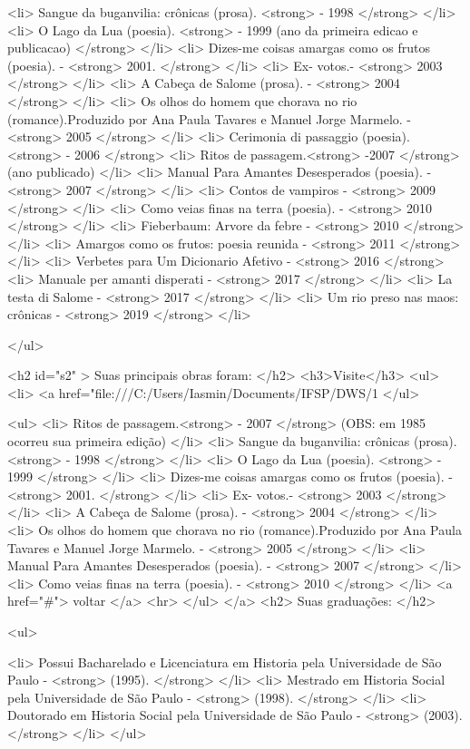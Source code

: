 <li> Sangue da buganvilia: crônicas (prosa). <strong> - 1998 </strong> </li> 
<li> O Lago da Lua (poesia). <strong> - 1999 (ano da primeira edicao e publicacao) </strong> </li>
<li> Dizes-me coisas amargas como os frutos (poesia). - <strong> 2001. </strong> </li>
<li> Ex- votos.- <strong> 2003 </strong> </li>
<li> A Cabeça de Salome (prosa). - <strong> 2004 </strong> </li>
<li> Os olhos do homem que chorava no rio (romance).Produzido por Ana Paula Tavares e Manuel Jorge Marmelo. - <strong> 2005 </strong> </li>
<li> Cerimonia di passaggio (poesia). <strong> - 2006 </strong>
<li> Ritos de passagem.<strong> -2007 </strong> (ano publicado) </li>
<li> Manual Para Amantes Desesperados (poesia). - <strong> 2007 </strong> </li>
<li> Contos de vampiros - <strong> 2009 </strong> </li>
<li> Como veias finas na terra (poesia). - <strong> 2010 </strong> </li>
<li> Fieberbaum: Arvore da febre - <strong> 2010 </strong> </li>
<li> Amargos como os frutos: poesia reunida - <strong> 2011 </strong> </li>
<li> Verbetes para Um Dicionario Afetivo - <strong> 2016 </strong>
<li> Manuale per amanti disperati - <strong> 2017 </strong> </li>
<li> La testa di Salome - <strong> 2017 </strong> </li>
<li> Um rio preso nas maos: crônicas - <strong> 2019 </strong> </li>

 </ul>
  
    <h2 id="s2" > Suas principais obras foram: </h2>
	 <h3>Visite</h3> 
  <ul>
 <li> <a href="file:///C:/Users/Iasmin/Documents/IFSP/DWS/1%
 </ul>

<ul>
  <li>  Ritos de passagem.<strong> - 2007 </strong> (OBS: em 1985 ocorreu sua primeira edição) </li>
  <li>  Sangue da buganvilia: crônicas (prosa). <strong> - 1998 </strong> </li> 
  <li>  O Lago da Lua (poesia). <strong> - 1999 </strong> </li>
  <li>  Dizes-me coisas amargas como os frutos (poesia). - <strong> 2001. </strong> </li>
  <li>  Ex- votos.- <strong> 2003 </strong> </li>
  <li>  A Cabeça de Salome (prosa). - <strong> 2004 </strong> </li>
  <li>  Os olhos do homem que chorava no rio (romance).Produzido por Ana Paula Tavares e Manuel Jorge Marmelo. - <strong> 2005 </strong> </li>
  <li>  Manual Para Amantes Desesperados (poesia). - <strong> 2007 </strong> </li>
  <li>  Como veias finas na terra (poesia). - <strong> 2010 </strong> </li>
  <a href="#"> voltar </a>
    <hr>  
 </ul>
</a>
 <h2> Suas graduações: </h2>

 <ul> 

<li> Possui Bacharelado e Licenciatura em Historia pela Universidade de São Paulo - <strong>  (1995). </strong> </li>
<li> Mestrado em Historia Social pela Universidade de São Paulo - <strong>  (1998). </strong> </li>
<li> Doutorado em Historia Social pela Universidade de São Paulo - <strong>  (2003). </strong> </li>
  </ul>
  
